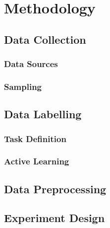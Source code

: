 \section{Methodology}
\subsection{Data Collection}
\subsubsection{Data Sources}
\subsubsection{Sampling}

\subsection{Data Labelling}
\subsubsection{Task Definition}
\subsubsection{Active Learning}

\subsection{Data Preprocessing}

\subsection{Experiment Design}